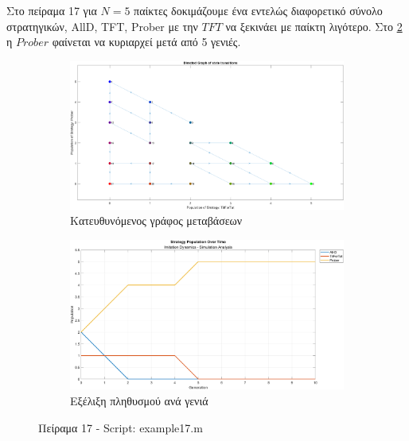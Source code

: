 \documentclass[12pt]{report}
\begin{document}
Στο πείραμα 17 για $N=5$ παίκτες δοκιμάζουμε ένα εντελώς διαφορετικό σύνολο στρατηγικών, \foreignlanguage{english}{AllD, TFT, Prober} με την $TFT$ να ξεκινάει με παίκτη λιγότερο. Στο \ref{fig:fig17-sim} η $Prober$ φαίνεται να κυριαρχεί μετά από 5 γενιές.
\begin{figure}[H]
    \centering

    \begin{subfigure}[b]{0.45\textwidth}
        \includegraphics[width=\linewidth]{Figures Imitation Dynamics/example17.png}
        \caption{Κατευθυνόμενος γράφος μεταβάσεων}
        \label{fig:fig17}
    \end{subfigure}
    \hfill
    \begin{subfigure}[b]{0.45\textwidth}
        \includegraphics[width=\linewidth]{Figures Imitation Dynamics/example17-sim.png}
        \caption{Εξέλιξη πληθυσμού ανά γενιά}
        \label{fig:fig17-sim}
    \end{subfigure}

    \caption{Πείραμα 17 - \foreignlanguage{english}{Script: example17.m}}
    \label{fig:example17}
\end{figure}
\end{document}
